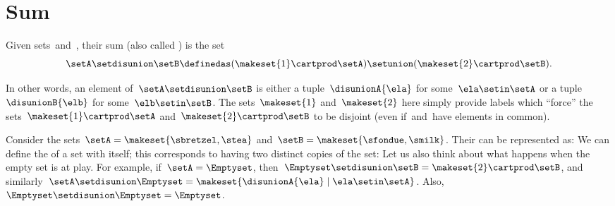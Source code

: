 
\section{Sum}
\label{sec:disjoint-union}

\begin{ctdefinition}
    \label{def:disjoint-union-of-sets}
    Given sets~\setA and~\setB, their sum (also called ) is the set
    \begin{equation}
        \setA \setdisunion \setB \definedas ( \makeset{ 1 } \cartprod \setA) \setunion ( \makeset{2} \cartprod \setB).
    \end{equation}
\end{ctdefinition}
In other words, an element of~$\setA \setdisunion \setB$ is either a tuple~$\disunionA{\ela}$ for some~$\ela \setin\setA$ or a tuple $\disunionB{\elb}$ for some~$\elb \setin\setB$.
The sets~$\makeset{ 1 }$ and~$\makeset{2}$ here simply provide labels which ``force'' the sets~$\makeset{ 1 } \cartprod \setA$ and~$ \makeset{2} \cartprod \setB$ to be disjoint (even if~\setA and~\setB have elements in common).



Consider the sets~$\setA=\makeset{\sbretzel, \stea}$ and~$\setB=\makeset{\sfondue, \smilk}$.
Their  can be represented as:
%
%
We can define the  of a set with itself; this corresponds to having two distinct copies of the set:
%
%
Let us also think about what happens when the empty set is at play.
For example, if~$\setA = \Emptyset$, then~$\Emptyset \setdisunion \setB = \makeset{2} \cartprod \setB$, and similarly~$\setA \setdisunion \Emptyset = \makeset{ \disunionA{\ela} \mid \ela \setin\setA }$.
Also,~$\Emptyset \setdisunion \Emptyset = \Emptyset$.

